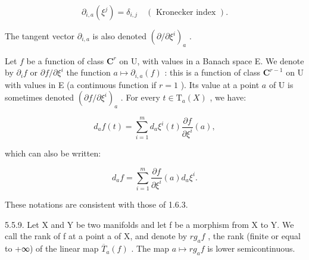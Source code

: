 \[
\partial_ {i, a} (\xi^ {j}) = \delta_ {i, j} \quad (\text { Kronecker index }).
\]

The tangent vector \(\partial_{i,a}\) is also denoted \((\partial/\partial\xi^{i})_{a}\) .

Let \(f\) be a function of class \(\mathbf{C}^r\) on U, with values in a Banach space E. We denote by \(\partial_i f\) or \(\partial f / \partial \xi^i\) the function \(a \mapsto \partial_{i,a}(f)\) : this is a function of class \(\mathbf{C}^{r-1}\) on U with values in E (a continuous function if \(r = 1\) ). Its value at a point \(a\) of U is sometimes denoted \((\partial f / \partial \xi^i)_a\) . For every \(t \in \mathrm{T}_a(X)\) , we have:

\[
d _ {a} f (t) = \sum_ {i = 1} ^ {m} d _ {a} \xi^ {i} (t) \frac {\partial f}{\partial \xi^ {i}} (a),
\]

which can also be written:

\[
d _ {a} f = \sum_ {i = 1} ^ {m} \frac {\partial f}{\partial \xi^ {i}} (a) d _ {a} \xi^ {i}.
\]

These notations are consistent with those of 1.6.3.

5.5.9. Let X and Y be two manifolds and let f be a morphism from X to Y. We call the rank of f at a point a of X, and denote by \(rg_{a}f\) , the rank (finite or equal to +∞) of the linear map \(\overline{T}_{a}(f)\) . The map \(a \mapsto rg_{a}f\) is lower semicontinuous.

